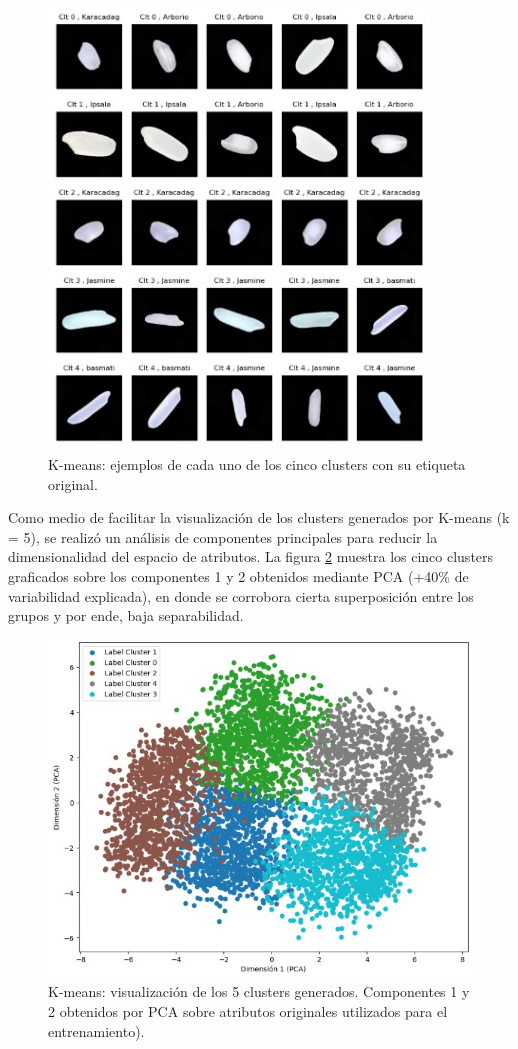 \documentclass{article}
\begin{document}
\begin{figure} [!htb]
	\centering
	\includegraphics[width= 0.9\textwidth]{fg/ejemplos_clusters.jpg}
	\caption{K-means: ejemplos de cada uno de los cinco clusters con su etiqueta original.}	
    \label{fg:ejemplos_clusters}
\end{figure}


Como medio de facilitar la visualización de los clusters generados por K-means (k = 5), se realizó un análisis de componentes principales para reducir la dimensionalidad del espacio de atributos.
La figura \ref{fg:pca} muestra los cinco clusters graficados sobre los componentes 1 y 2 obtenidos mediante PCA (+40\% de variabilidad explicada), en donde se corrobora cierta superposición entre los grupos y por ende, baja separabilidad.

\begin{figure} [!htb]
	\centering
	\includegraphics[height= 8.0 cm]{fg/PCA_clusters.jpg}
	\caption{K-means: visualización de los 5 clusters generados. Componentes 1 y 2 obtenidos por PCA sobre atributos originales utilizados para el entrenamiento).}	
    \label{fg:pca}
\end{figure}
\end{document}
